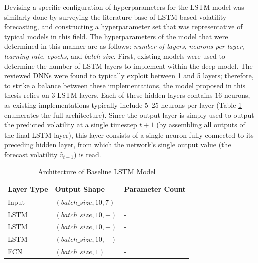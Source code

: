 \documentclass[a4paper, 11pt]{report}
\begin{document}
    Devising a specific configuration of hyperparameters for the LSTM model was similarly done by surveying the literature base of LSTM-based volatility forecasting, and constructing a hyperparameter set that was representative of typical models in this field. The hyperparameters of the model that were determined in this manner are as follows: \emph{number of layers}, \emph{neurons per layer}, \emph{learning rate}, \emph{epochs}, and \emph{batch size}. First, existing models were used to determine the number of LSTM layers to implement within the deep model. The reviewed DNNs were found to typically exploit between 1 \citep{bucci-2020} and 5 \citep{kim-2018} layers; therefore, to strike a balance between these implementations, the model proposed in this thesis relies on $3$ LSTM layers. Each of these hidden layers contains $16$ neurons, as existing implementations typically include 5--25 neurons per layer (Table \ref{table: architecture} enumerates the full architecture). Since the output layer is simply used to output the predicted volatility at a single timestep $t+1$ (by assembling all outputs of the final LSTM layer), this layer consists of a single neuron fully connected to its preceding hidden layer, from which the network's single output value (the forecast volatility $\hat{v}_{t+1}$) is read.


    \begin{table}[ht]
        \centering
        \label{table: architecture}
        \begin{tabular}{|lll|} 
            \hline
            \textbf{Layer Type} & \textbf{Output Shape} & \textbf{Parameter Count}  \\ 
            \hline
            Input           & $(batch\_size, 10, 7)$             & -                \\ 
            \hline
            LSTM           & $(batch\_size, 10, -)$             & -                \\ 
            \hline
            LSTM           & $(batch\_size, 10, -)$             & -               \\ 
            \hline
            LSTM           & $(batch\_size, 10, -)$             & -               \\ 
            \hline
            FCN            & $(batch\_size, 1)$                   & -                  \\
            \hline
        \end{tabular}

        \caption{\centering Architecture of Baseline LSTM Model}
    \end{table}
\end{document}
